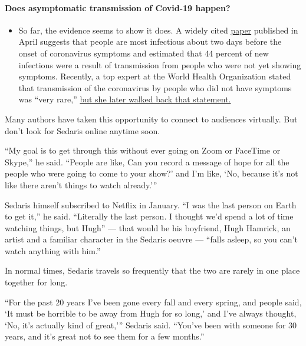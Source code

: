 \begin{itemize}
{  \paragraph{Does asymptomatic transmission of Covid-19
  happen?}\label{does-asymptomatic-transmission-of-covid-19-happen}}

  \begin{itemize}
  \tightlist
  \item
    So far, the evidence seems to show it does. A widely cited
    \href{https://www.nature.com/articles/s41591-020-0869-5}{paper}
    published in April suggests that people are most infectious about
    two days before the onset of coronavirus symptoms and estimated that
    44 percent of new infections were a result of transmission from
    people who were not yet showing symptoms. Recently, a top expert at
    the World Health Organization stated that transmission of the
    coronavirus by people who did not have symptoms was ``very rare,''
    \href{https://www.nytimes.com/2020/06/09/world/coronavirus-updates.html?action=click\&pgtype=Article\&state=default\&region=MAIN_CONTENT_3\&context=storylines_faq\#link-1f302e21}{but
    she later walked back that statement.}
  \end{itemize}
\end{itemize}

Many authors have taken this opportunity to connect to audiences
virtually. But don't look for Sedaris online anytime soon.

``My goal is to get through this without ever going on Zoom or FaceTime
or Skype,'' he said. ``People are like, Can you record a message of hope
for all the people who were going to come to your show?' and I'm like,
`No, because it's not like there aren't things to watch already.'''

Sedaris himself subscribed to Netflix in January. ``I was the last
person on Earth to get it,'' he said. ``Literally the last person. I
thought we'd spend a lot of time watching things, but Hugh'' --- that
would be his boyfriend, Hugh Hamrick, an artist and a familiar character
in the Sedaris oeuvre --- ``falls asleep, so you can't watch anything
with him.''

In normal times, Sedaris travels so frequently that the two are rarely
in one place together for long.

``For the past 20 years I've been gone every fall and every spring, and
people said, `It must be horrible to be away from Hugh for so long,' and
I've always thought, `No, it's actually kind of great,''' Sedaris said.
``You've been with someone for 30 years, and it's great not to see them
for a few months.''

